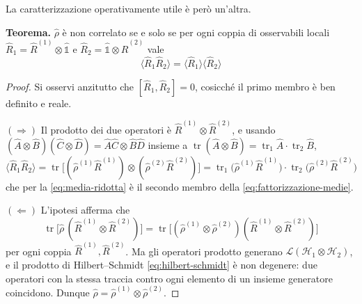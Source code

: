 La caratterizzazione operativamente utile è però un'altra.
%
\begin{tcolorbox}[colback=black!5!white, colframe=black!45!white, boxrule=0.8pt]
\textbf{Teorema.} $\hat{\rho}$ è non correlato se e solo se per ogni
coppia di osservabili locali $\hat{R}_1 = \hat{R}^{(1)} \otimes
\hat{\mathbb{1}}$ e $\hat{R}_2 = \hat{\mathbb{1}} \otimes \hat{R}^{(2)}$
vale
%
\begin{equation}
    \bigl\langle \hat{R}_1 \hat{R}_2 \bigr\rangle
    = \bigl\langle \hat{R}_1 \bigr\rangle
      \bigl\langle \hat{R}_2 \bigr\rangle
    \label{eq:fattorizzazione-medie}
\end{equation}
\end{tcolorbox}
%
\begin{proof}
Si osservi anzitutto che $[\hat{R}_1, \hat{R}_2] = 0$, cosicché il primo
membro è ben definito e reale.

$(\Rightarrow)$ Il prodotto dei due operatori è $\hat{R}^{(1)} \otimes
\hat{R}^{(2)}$, e usando
$(\hat{A} \otimes \hat{B})(\hat{C} \otimes \hat{D}) = \hat{A}\hat{C}
\otimes \hat{B}\hat{D}$ insieme a
$\operatorname{tr} (\hat{A} \otimes \hat{B}) =
\operatorname{tr}_1 \hat{A} \cdot \operatorname{tr}_2 \hat{B}$,
%
\begin{equation*}
    \bigl\langle \hat{R}_1 \hat{R}_2 \bigr\rangle
    = \operatorname{tr} \bigl[ ( \hat{\rho}^{(1)} \hat{R}^{(1)} )
      \otimes ( \hat{\rho}^{(2)} \hat{R}^{(2)} ) \bigr]
    = \operatorname{tr}_1 \bigl( \hat{\rho}^{(1)} \hat{R}^{(1)} ) \cdot
      \operatorname{tr}_2 \bigl( \hat{\rho}^{(2)} \hat{R}^{(2)} )
\end{equation*}
%
che per la \eqref{eq:media-ridotta} è il secondo membro della
\eqref{eq:fattorizzazione-medie}.

$(\Leftarrow)$ L'ipotesi afferma che
%
\begin{equation*}
    \operatorname{tr} \bigl[ \hat{\rho} \, ( \hat{R}^{(1)} \otimes
    \hat{R}^{(2)} ) \bigr]
    = \operatorname{tr} \bigl[ ( \hat{\rho}^{(1)} \otimes
    \hat{\rho}^{(2)} ) ( \hat{R}^{(1)} \otimes \hat{R}^{(2)} ) \bigr]
\end{equation*}
%
per ogni coppia $\hat{R}^{(1)}, \hat{R}^{(2)}$. Ma gli operatori prodotto
generano $\mathcal{L}(\mathcal{H}_1 \otimes \mathcal{H}_2)$, e il
prodotto di Hilbert--Schmidt \eqref{eq:hilbert-schmidt} è non degenere:
due operatori con la stessa traccia contro ogni elemento di un insieme
generatore coincidono. Dunque $\hat{\rho} = \hat{\rho}^{(1)} \otimes
\hat{\rho}^{(2)}$.
\end{proof}

